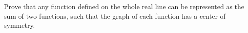 Prove that any function defined on the whole real line can be represented as the sum of two functions, such that the graph of each function has a center of symmetry.
